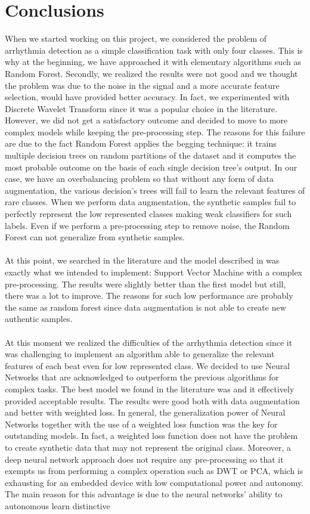 \documentclass[LaM,binding=0.6cm]{sapthesis}
\begin{document}
\chapter{Conclusions}
When we started working on this project, we considered the problem of arrhythmia detection as a simple classification task with only four classes. This is why at the beginning, we have approached it with elementary algorithms such as Random Forest. Secondly, we realized the results were not good and we thought the problem was due to the noise in the signal and a more accurate feature selection, would have provided better accuracy. In fact, we experimented with Discrete Wavelet Transform since it was a popular choice in the literature. However, we did not get a satisfactory outcome and decided to move to more complex models while keeping the pre-processing step. The reasons for this failure are due to the fact Random Forest applies the begging technique: it trains multiple decision trees on random partitions of the dataset and it computes the most probable outcome on the basis of each single decision tree's output. In our case, we have an overbalancing problem so that without any form of data augmentation, the various decision's trees will fail to learn the relevant features of rare classes. When we perform data augmentation, the synthetic samples fail to perfectly represent the low represented classes making weak classifiers for such labels. Even if we perform a pre-processing step to remove noise, the Random Forest can not generalize from synthetic samples.\\\\At this point, we searched in the literature and the model described in \cite{svmnl} was exactly what we intended to implement: Support Vector Machine with a complex pre-processing. The results were slightly better than the first model but still, there was a lot to improve. The reasons for such low performance are probably the same as random forest since data augmentation is not able to create new authentic samples.\\\\At this moment we realized the difficulties of the arrhythmia detection since it was challenging to implement an algorithm able to generalize the relevant features of each beat even for low represented class. We decided to use Neural Networks that are acknowledged to outperform the previous algorithms for complex tasks. The best model we found in the literature was \cite{cnnfazeli} and it effectively provided acceptable results. The results were good both with data augmentation and better with weighted loss. In general, the generalization power of Neural Networks together with the use of a weighted loss function was the key for outstanding models. In fact, a weighted loss function does not have the problem to create synthetic data that may not represent the original class. Moreover, a deep neural network approach does not require any pre-processing so that it exempts us from performing a complex operation such as DWT or PCA, which is exhausting for an embedded device with low computational power and autonomy. The main reason for this advantage is due to the neural networks' ability to autonomous learn distinctive 
\end{document}
